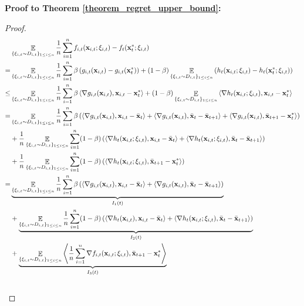 \documentclass{article}
\begin{document}
\textbf{Proof to Theorem \ref{theorem_regret_upper_bound}:}
\begin{proof}
\begin{align}
\nonumber
& \mathop{\mathbb{E}}_{ \{\xi_{i,t} \sim D_{i,t}\}_{1\le i \le n} } \frac{1}{n}\sum_{i=1}^n f_{i,t}({\bf x}_{i,t};\xi_{i,t}) - f_t({\bf x}_t^\ast;\xi_{i,t}) \\ \nonumber
=& \mathop{\mathbb{E}}_{ \{\xi_{i,t} \sim D_{i,t}\}_{1\le i \le n} }\frac{1}{n}\sum_{i=1}^n \beta \left( g_{i,t}({\bf x}_{i,t}) - g_{i,t}({\bf x}_t^\ast) \right) + (1-\beta) \mathop{\mathbb{E}}_{ \{\xi_{i,t} \sim D_{i,t}\}_{1\le i \le n} } \left( h_t({\bf x}_{i,t};\xi_{i,t}) - h_t({\bf x}_t^\ast;\xi_{i,t}) \right) \\ \nonumber
\le & \mathop{\mathbb{E}}_{ \{\xi_{i,t} \sim D_{i,t}\}_{1\le i \le n} }\frac{1}{n}\sum_{i=1}^n \beta \left\langle\nabla g_{i,t}({\bf x}_{i,t}), {\bf x}_{i,t} - {\bf x}_t^\ast  \right\rangle + (1-\beta) \mathop{\mathbb{E}}_{ \{\xi_{i,t} \sim D_{i,t}\}_{1\le i \le n} } \left\langle\nabla h_t({\bf x}_{i,t};\xi_{i,t}), {\bf x}_{i,t} - {\bf x}_t^\ast  \right\rangle \\ \nonumber
 = & \mathop{\mathbb{E}}_{ \{\xi_{i,t} \sim D_{i,t}\}_{1\le i \le n} }\frac{1}{n}\sum_{i=1}^n \beta \left( \left\langle\nabla g_{i,t}({\bf x}_{i,t}), {\bf x}_{i,t} - \bar{{\bf x}}_t  \right\rangle + \left\langle\nabla g_{i,t}({\bf x}_{i,t}), \bar{{\bf x}}_t - \bar{{\bf x}}_{t+1} \right\rangle + \left\langle\nabla g_{i,t}({\bf x}_{i,t}), \bar{{\bf x}}_{t+1} - {\bf x}_t^\ast   \right\rangle  \right) \\ \nonumber 
 & + \frac{1}{n}\mathop{\mathbb{E}}_{ \{\xi_{i,t} \sim D_{i,t}\}_{1\le i \le n} }\sum_{i=1}^n (1-\beta) \left(   \left\langle\nabla h_t({\bf x}_{i,t};\xi_{i,t}), {\bf x}_{i,t} - \bar{{\bf x}}_t  \right\rangle +  \left\langle\nabla h_t({\bf x}_{i,t};\xi_{i,t}), \bar{{\bf x}}_t - \bar{{\bf x}}_{t+1}  \right\rangle  \right) \\ \nonumber 
 & + \frac{1}{n}\mathop{\mathbb{E}}_{ \{\xi_{i,t} \sim D_{i,t}\}_{1\le i \le n} }\sum_{i=1}^n (1-\beta) \left(  \left\langle\nabla h_t({\bf x}_{i,t};\xi_{i,t}), \bar{{\bf x}}_{t+1} - {\bf x}_t^\ast  \right\rangle  \right)\\ \nonumber
= & \underbrace{ \mathop{\mathbb{E}}_{ \{\xi_{i,t} \sim D_{i,t}\}_{1\le i \le n} } \frac{1}{n}\sum_{i=1}^n \beta \left( \left\langle\nabla g_{i,t}({\bf x}_{i,t}), {\bf x}_{i,t} - \bar{{\bf x}}_t  \right\rangle + \left\langle\nabla g_{i,t}({\bf x}_{i,t}), \bar{{\bf x}}_t - \bar{{\bf x}}_{t+1}  \right\rangle  \right) }_{I_1(t)} \\ \nonumber 
 & + \underbrace{ \mathop{\mathbb{E}}_{ \{\xi_{i,t} \sim D_{i,t}\}_{1\le i \le n} } \frac{1}{n}\sum_{i=1}^n (1-\beta) \left(  \left\langle\nabla h_t({\bf x}_{i,t}), {\bf x}_{i,t} - \bar{{\bf x}}_t  \right\rangle +   \left\langle\nabla h_t({\bf x}_{i,t};\xi_{i,t}), \bar{{\bf x}}_t - \bar{{\bf x}}_{t+1}  \right\rangle \right) }_{I_2(t)}\\ \nonumber 
&+ \underbrace{ \mathop{\mathbb{E}}_{ \{\xi_{i,t} \sim D_{i,t}\}_{1\le i \le n} } \left\langle\frac{1}{n}\sum_{i=1}^n\nabla f_{i,t}({\bf x}_{i,t};\xi_{i,t}), \bar{{\bf x}}_{t+1} - {\bf x}_t^\ast  \right\rangle }_{I_3(t)}\\ \nonumber
\end{align}


\end{proof}
\end{document}
